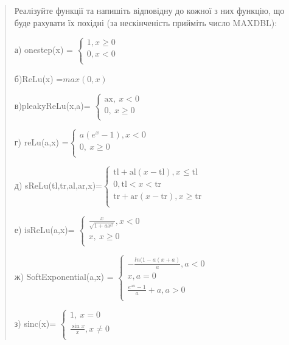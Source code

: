 \documentclass[]{article}
\begin{document}
\begin{quote}
Реалізуйте функції та напишіть відповідну до кожної з них функцію, що
буде рахувати їх похідні (за нескінченість прийміть число MAXDBL):

а) onestep(x) = \(\left\{ \begin{matrix}
1,x \geq 0 \\
0,x < 0 \\
\end{matrix} \right.\ \)

б)ReLu(x) =\(max(0,x)\)

в)pleakyReLu(x,a)= \(\left\{ \begin{matrix}
\text{ax},\ x < 0 \\
0,\ x \geq 0 \\
\end{matrix} \right.\ \)

г) reLu(a,x) =\(\left\{ \begin{matrix}
a(e^{x} - 1),x < 0 \\
0,\ x \geq 0 \\
\end{matrix} \right.\ \)

д) sReLu(tl,tr,al,ar,x)=\(\left\{ \begin{matrix}
\text{tl} + \text{al}\left( x - \text{tl} \right),x \leq \text{tl} \\
0,\text{tl} < x < \text{tr} \\
\text{tr} + \text{ar}\left( x - \text{tr} \right),x \geq \text{tr} \\
\end{matrix} \right.\ \)

е) isReLu(a,x)= \(\left\{ \begin{matrix}
\frac{x}{\sqrt{1 + ax^{2}}},x < 0 \\
x,\ x \geq 0 \\
\end{matrix} \right.\ \)

ж) SoftExponential(a,x) = \(\left\{ \begin{matrix}
 - \frac{ln(1 - a(x + a)}{a},a < 0 \\
x,a = 0 \\
\frac{e^{\text{ax}} - 1}{a} + a,a > 0 \\
\end{matrix} \right.\ \)

з) sinc(x)= \(\left\{ \begin{matrix}
1,\ x = 0 \\
\frac{\sin x}{x},x \neq 0 \\
\end{matrix} \right.\ \)


\end{quote}
\end{document}
